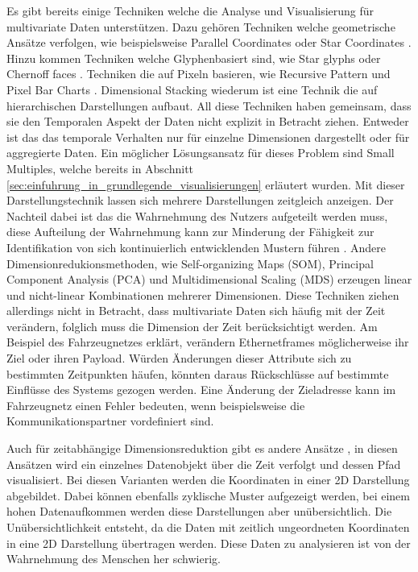 \documentclass[draft=false
              ,paper=a4
              ,twoside=false
              ,fontsize=11pt
              ,headsepline
              ,BCOR10mm
              ,DIV11
              ]{scrbook}
\begin{document}
Es gibt bereits einige Techniken welche die Analyse und Visualisierung für multivariate Daten unterstützen. Dazu gehören Techniken welche geometrische Ansätze verfolgen, wie beispielsweise Parallel Coordinates \cite{inselberg_parallel_1987} oder Star Coordinates \cite{kandogan_star_2000}. Hinzu kommen Techniken welche Glyphenbasiert sind, wie Star glyphs \cite{chambers_graphical_1983} oder Chernoff faces \cite{chernoff_use_1973}. Techniken die auf Pixeln basieren, wie Recursive Pattern \cite{keim_recursive_1995} und Pixel Bar Charts \cite{keim_pixel_2002}. Dimensional Stacking \cite{leblanc_exploring_1990} wiederum ist eine Technik die auf hierarchischen Darstellungen aufbaut. All diese Techniken haben gemeinsam, dass sie den Temporalen Aspekt der Daten nicht explizit in Betracht ziehen. Entweder ist das das temporale Verhalten nur für einzelne Dimensionen dargestellt oder für aggregierte Daten. Ein möglicher Lösungsansatz für dieses Problem sind Small Multiples, welche bereits in Abschnitt \ref{sec:einfuhrung_in_grundlegende_visualisierungen} erläutert wurden. Mit dieser Darstellungstechnik lassen sich mehrere Darstellungen zeitgleich anzeigen. Der Nachteil dabei ist das die Wahrnehmung des Nutzers aufgeteilt werden muss, diese Aufteilung der Wahrnehmung kann zur Minderung der Fähigkeit zur Identifikation von sich kontinuierlich entwicklenden Mustern führen \cite{alan_dix_human-computer_2004}. Andere Dimensionredukionsmethoden, wie Self-organizing Maps (SOM), Principal Component Analysis (PCA) und Multidimensional Scaling (MDS) erzeugen linear und nicht-linear Kombinationen mehrerer Dimensionen. Diese Techniken ziehen allerdings nicht in Betracht, dass multivariate Daten sich häufig mit der Zeit verändern, folglich muss die Dimension der Zeit berücksichtigt werden. Am Beispiel des Fahrzeugnetzes erklärt, verändern Ethernetframes möglicherweise ihr Ziel oder ihren Payload. Würden Änderungen dieser Attribute sich zu bestimmten Zeitpunkten häufen, könnten daraus Rückschlüsse auf bestimmte Einflüsse des Systems gezogen werden. Eine Änderung der Zieladresse kann im Fahrzeugnetz einen Fehler bedeuten, wenn beispielsweise die Kommunikationspartner vordefiniert sind. 

Auch für zeitabhängige Dimensionsreduktion gibt es andere Ansätze \cite{bernard_timeseriespaths_2012}\cite{mao_sequential_2007}\cite{ward_interactive_2010}, in diesen Ansätzen wird ein einzelnes Datenobjekt über die Zeit verfolgt und dessen Pfad visualisiert. Bei diesen Varianten werden die Koordinaten in einer 2D Darstellung abgebildet. Dabei können ebenfalls zyklische Muster aufgezeigt werden, bei einem hohen Datenaufkommen werden diese Darstellungen aber unübersichtlich. Die Unübersichtlichkeit entsteht, da die Daten mit zeitlich ungeordneten Koordinaten in eine 2D Darstellung übertragen werden. Diese Daten zu analysieren ist von der Wahrnehmung des Menschen her schwierig.
\end{document}
